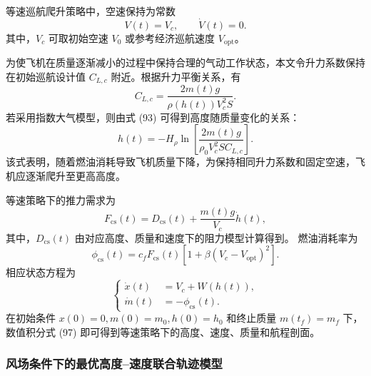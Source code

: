 \documentclass[UTF8]{ctexart}
\begin{document}
等速巡航爬升策略中，空速保持为常数
\begin{equation}
    V(t)=V_c,
    \qquad
    \dot V(t)=0.
    \label{eq:q4_const_speed}
\end{equation}
其中，$V_c$ 可取初始空速 $V_0$ 或参考经济巡航速度 $V_{\mathrm{opt}}$。

为使飞机在质量逐渐减小的过程中保持合理的气动工作状态，本文令升力系数保持在初始巡航设计值
$C_{L,c}$ 附近。根据升力平衡关系，有
\begin{equation}
    C_{L,c}
    =
    \frac{2m(t)g}{\rho(h(t))V_c^2S}.
    \label{eq:q4_CL_const}
\end{equation}
若采用指数大气模型，则由式 (93) 可得到高度随质量变化的关系：
\begin{equation}
    h(t)
    =
    -H_\rho
    \ln
    \left[
    \frac{2m(t)g}{\rho_0V_c^2SC_{L,c}}
    \right].
    \label{eq:q4_h_m_const_speed}
\end{equation}
该式表明，随着燃油消耗导致飞机质量下降，为保持相同升力系数和固定空速，飞机应逐渐爬升至更高高度。

等速策略下的推力需求为
\begin{equation}
    F_{\mathrm{cs}}(t)
    =
    D_{\mathrm{cs}}(t)
    +
    \frac{m(t)g}{V_c}\dot h(t),
    \label{eq:q4_F_const_speed}
\end{equation}
其中，$D_{\mathrm{cs}}(t)$ 由对应高度、质量和速度下的阻力模型计算得到。
燃油消耗率为
\begin{equation}
    \phi_{\mathrm{cs}}(t)
    =
    c_fF_{\mathrm{cs}}(t)
    \left[
    1+\beta\left(V_c-V_{\mathrm{opt}}\right)^2
    \right].
    \label{eq:q4_phi_const_speed}
\end{equation}
相应状态方程为
\begin{equation}
\left\{
\begin{aligned}
    \dot x(t)&=V_c+W(h(t)),\\
    \dot m(t)&=-\phi_{\mathrm{cs}}(t).
\end{aligned}
\right.
\label{eq:q4_cs_ode}
\end{equation}
在初始条件 $x(0)=0,m(0)=m_0,h(0)=h_0$ 和终止质量 $m(t_f)=m_f$ 下，
数值积分式 (97) 即可得到等速策略下的高度、速度、质量和航程剖面。

\subsubsection{风场条件下的最优高度--速度联合轨迹模型}
\end{document}
